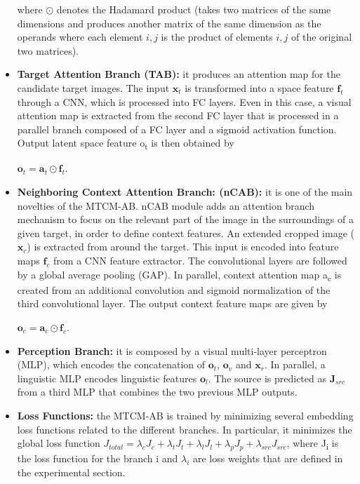 \begin{itemize}
  where $\odot$ denotes the Hadamard product (takes two matrices of
  the same dimensions and produces another matrix of the same dimension
  as the operands where each element $i, j$ is the product of elements
  $i, j$ of the original two matrices).
\item
  \textbf{Target Attention Branch (TAB):} it produces an attention map
  for the candidate target images. The input ${\mathbf{x}_t}$ is
  transformed into a space feature ${\mathbf{f}_t}$ through a CNN, which
  is processed into FC layers. Even in this case, a visual attention map
  is extracted from the second FC layer that is processed in a parallel
  branch composed of a FC layer and a sigmoid activation function.
  Output latent space feature o\textsubscript{t} is then obtained by

  $ {\mathbf o}_{t}= {\mathbf a}_t \odot {\mathbf f}_{t}.$
\item
  \textbf{Neighboring Context Attention Branch: (nCAB):} it is one of
  the main novelties of the MTCM-AB. nCAB module adds an attention
  branch mechanism to focus on the relevant part of the image in the
  surroundings of a given target, in order to define context features.
  An extended cropped image (${\mathbf x}_c$) is extracted from around the
  target. This input is encoded into feature maps ${\mathbf{f}_c}$ from a
  CNN feature extractor. The convolutional layers are followed by a
  global average pooling (GAP). In parallel, context attention map
  a\textsubscript{c} is created from an additional convolution and
  sigmoid normalization of the third convolutional layer. The output
  context feature maps are given by

  $ {\mathbf o}_{c}= {\mathbf a}_{c} \odot {\mathbf f}_{c}.$
\item
  \textbf{Perception Branch:} it is composed by a visual multi-layer
  perceptron (MLP), which encodes the concatenation of ${\mathbf{o}_t}$,
  ${\mathbf{o}_v}$ and ${\mathbf{x}_r}$. In parallel, a linguistic MLP
  encodes linguistic features ${\mathbf{o}_l}$. The source is predicted as
  ${\mathbf{J}_{src}}$ from a third MLP that combines the two previous MLP
  outputs.
\item
  \textbf{Loss Functions:} the MTCM-AB is trained by minimizing several
  embedding loss functions related to the different branches. In
  particular, it minimizes the global loss function
  $J_{total} = \lambda_cJ_c + \lambda_tJ_t + \lambda_lJ_l + \lambda_pJ_p + \lambda_{src}J_{src}$,
  where J\textsubscript{i} is the loss function for the branch i and
  $\lambda_i$ are loss weights that are defined in the experimental
  section.
\end{itemize}

